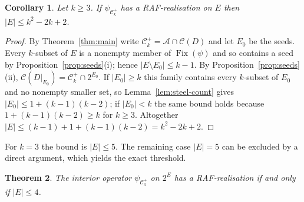 \documentclass[11pt,a4paper]{article}
\theoremstyle{plain}
\newtheorem{theorem}{Theorem}[section]
\newtheorem{corollary}[theorem]{Corollary}
\theoremstyle{definition}
\theoremstyle{remark}
\newcommand{\Fix}{\operatorname{Fix}}
\newcommand{\cA}{\mathcal{A}}
\newcommand{\cC}{\mathcal{C}}
\newcommand{\pw}[1]{2^{#1}}
\newcommand{\Cplus}[1]{\cC^{+}_{#1}}
\begin{document}
\begin{corollary}\label{cor:cplus-bound}
Let $k\ge3$. If $\psi_{\Cplus{k}}$ has a RAF-realisation on $E$ then $|E|\le k^2-2k+2$.
\end{corollary}

\begin{proof}
By Theorem~\ref{thm:main} write $\Cplus{k}=\cA\cap\cC(D)$ and let $E_0$ be the seeds. Every $k$-subset of $E$ is a nonempty member of $\Fix(\psi)$ and so contains a seed by Proposition~\ref{prop:seeds}(i); hence $|E\setminus E_0|\le k-1$. By Proposition~\ref{prop:seeds}(ii), $\cC(D|_{E_0})=\Cplus{k}\cap\pw{E_0}$. If $|E_0|\ge k$ this family contains every $k$-subset of $E_0$ and no nonempty smaller set, so Lemma~\ref{lem:steel-count} gives $|E_0|\le 1+(k-1)(k-2)$; if $|E_0|<k$ the same bound holds because $1+(k-1)(k-2)\ge k$ for $k\ge3$. Altogether $|E|\le (k-1)+1+(k-1)(k-2)=k^2-2k+2$.
\end{proof}

For $k=3$ the bound is $|E|\le5$. The remaining case $|E|=5$ can be excluded by a direct argument, which yields the exact threshold.

\begin{theorem}\label{thm:cplus3}
The interior operator $\psi_{\Cplus{3}}$ on $\pw{E}$ has a RAF-realisation if and only if $|E|\le4$.
\end{theorem}
\end{document}
